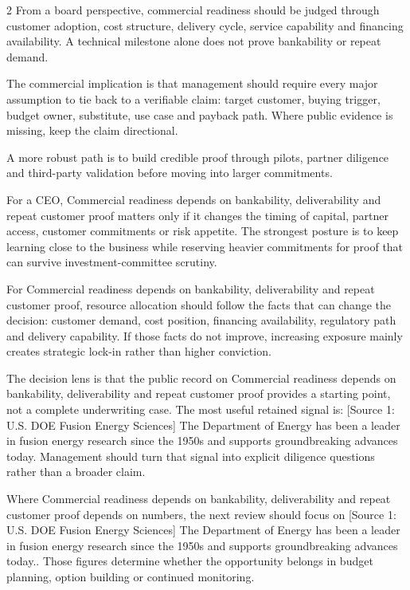 \documentclass[10pt,a4paper]{article}
\begin{document}
\begin{multicols}{2}
{\small From a board perspective, commercial readiness should be judged through customer adoption, cost structure, delivery cycle, service capability and financing availability. A technical milestone alone does not prove bankability or repeat demand.}\par
{\small The commercial implication is that management should require every major assumption to tie back to a verifiable claim: target customer, buying trigger, budget owner, substitute, use case and payback path. Where public evidence is missing, keep the claim directional.}\par
{\small A more robust path is to build credible proof through pilots, partner diligence and third-party validation before moving into larger commitments.}\par
{\small For a CEO, Commercial readiness depends on bankability, deliverability and repeat customer proof matters only if it changes the timing of capital, partner access, customer commitments or risk appetite. The strongest posture is to keep learning close to the business while reserving heavier commitments for proof that can survive investment-committee scrutiny.}\par
{\small For Commercial readiness depends on bankability, deliverability and repeat customer proof, resource allocation should follow the facts that can change the decision: customer demand, cost position, financing availability, regulatory path and delivery capability. If those facts do not improve, increasing exposure mainly creates strategic lock-in rather than higher conviction.}\par
{\small The decision lens is that the public record on Commercial readiness depends on bankability, deliverability and repeat customer proof provides a starting point, not a complete underwriting case. The most useful retained signal is: [Source 1: U.S. DOE Fusion Energy Sciences] The Department of Energy has been a leader in fusion energy research since the 1950s and supports groundbreaking advances today. Management should turn that signal into explicit diligence questions rather than a broader claim.}\par
{\small Where Commercial readiness depends on bankability, deliverability and repeat customer proof depends on numbers, the next review should focus on [Source 1: U.S. DOE Fusion Energy Sciences] The Department of Energy has been a leader in fusion energy research since the 1950s and supports groundbreaking advances today.. Those figures determine whether the opportunity belongs in budget planning, option building or continued monitoring.}\par
\end{multicols}
\label{chap:5:end}
\end{document}
